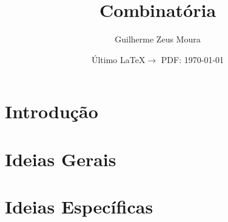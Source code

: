\documentclass[10pt, a4paper, oneside]{book}
\title{Combinatória}
\author{Guilherme Zeus Moura}
\date{Último \LaTeX $\to$ PDF: \today}
\begin{document}
	\maketitle

	\tableofcontents

	\part{Introdução}

		
	
		

	\part{Ideias Gerais}
	
		

		

		

		

		

	\part{Ideias Específicas}

		

		

		

		

		
\end{document}
